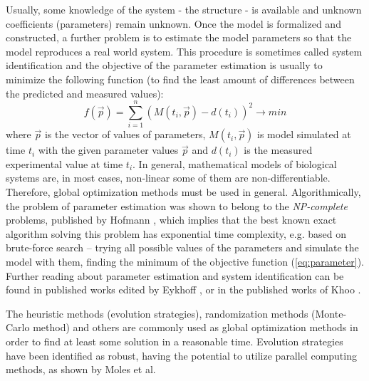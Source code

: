 Usually, some knowledge of the system - the structure - is available and unknown coefficients (parameters) remain unknown. Once the model is formalized and constructed, a further problem is to estimate the model parameters so that the model reproduces a real world system. This procedure is sometimes called system identification and the objective of the parameter estimation is usually to minimize the following function (to find the least amount of differences between the predicted and measured values):
\begin{equation} \label{eq:parameter} 
f( \vec{p} ) = \sum_{i=1}^{n} ( M(t_{i},\vec{p} ) - d(t_{i}) )^2 \to min  
\end{equation} 
where $\vec{p}$ is the vector of values of parameters, $M(t_{i},\vec{p})$ is model simulated at time $t_{i} $ with the given parameter values $\vec{p}$ and $d(t_{i})$ is the measured experimental value at time $t_{i}$. 
In general, mathematical models of biological systems are, in most cases, non-linear some of them are non-differentiable.  Therefore, global optimization methods must be used in general. Algorithmically, the problem of parameter estimation was shown to belong to the \emph{NP-complete} problems, published by Hofmann \cite{Hofmann2005}, which implies that the best known exact algorithm solving this problem has exponential time complexity, e.g. based on brute-force search -- trying all possible values of the parameters and simulate the model with them, finding the minimum of the objective function (\ref{eq:parameter}).
Further reading about parameter estimation and system identification can be found in published works edited by Eykhoff \cite{Eykhoff1981}, or in the published works of Khoo \cite[p.~159]{khoo2000}.

The heuristic methods (evolution strategies), randomization methods (Monte-Carlo method) and others are commonly used as global optimization methods in order to find at least some solution in a reasonable time. Evolution strategies have been identified as robust, having the potential to utilize parallel computing methods, as shown by Moles et al.\cite{Moles2003}

